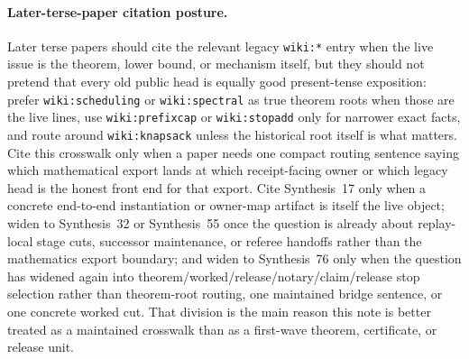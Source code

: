 \documentclass[11pt]{article}
\begin{document}
\paragraph{Later-terse-paper citation posture.}
Later terse papers should cite the relevant legacy \texttt{wiki:*} entry when the live issue is the theorem, lower bound, or mechanism itself, but they should not pretend that every old public head is equally good present-tense exposition: prefer \texttt{wiki:scheduling} or \texttt{wiki:spectral} as true theorem roots when those are the live lines, use \texttt{wiki:prefixcap} or \texttt{wiki:stopadd} only for narrower exact facts, and route around \texttt{wiki:knapsack} unless the historical root itself is what matters. Cite this crosswalk only when a paper needs one compact routing sentence saying which mathematical export lands at which receipt-facing owner or which legacy head is the honest front end for that export. Cite Synthesis~17 only when a concrete end-to-end instantiation or owner-map artifact is itself the live object; widen to Synthesis~32 or Synthesis~55 once the question is already about replay-local stage cuts, successor maintenance, or referee handoffs rather than the mathematics export boundary; and widen to Synthesis~76 only when the question has widened again into theorem/worked/release/notary/claim/release stop selection rather than theorem-root routing, one maintained bridge sentence, or one concrete worked cut. That division is the main reason this note is better treated as a maintained crosswalk than as a first-wave theorem, certificate, or release unit.\cite{series:workedexample,series:releasespine,series:seriesspines,series:theoremtopublicationspine}
\end{document}
